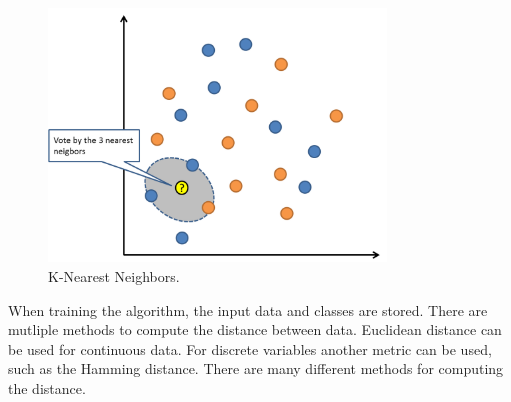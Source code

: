 \begin{figure}[H]
\centering
\includegraphics[width=0.8\textwidth]{Figures/knn}
\decoRule
\caption[K-Nearest Neighbors]{K-Nearest Neighbors. \cite{knn}}
\label{fig:knn}
\end{figure}

\noindent When training the algorithm, the input data and classes are stored. There are mutliple methods to compute the distance between data. Euclidean distance can be used for continuous data. For discrete variables another metric can be used, such as the Hamming distance. There are many different methods for computing the distance.

